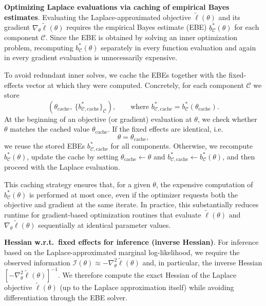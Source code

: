 \documentclass[12pt]{article}
\begin{document}
\textbf{Optimizing Laplace evaluations via caching of empirical Bayes estimates}. 
Evaluating the Laplace-approximated objective \(\tilde\ell(\theta)\) and its gradient \(\nabla_\theta \tilde\ell(\theta)\) requires the empirical Bayes estimate (EBE) \(b_{\mathcal{C}}^*(\theta)\) for each component \(\mathcal{C}\). Since the EBE is obtained by solving an inner optimization problem, recomputing \(b_{\mathcal{C}}^*(\theta)\) separately in every function evaluation and again in every gradient evaluation is unnecessarily expensive.

To avoid redundant inner solves, we cache the EBEs together with the fixed-effects vector at which they were computed. Concretely, for each component \(\mathcal{C}\) we store
\[
(\theta_{\mathrm{cache}},\ \{b_{\mathcal{C},\mathrm{cache}}^*\}_{\mathcal{C}}),
\qquad \text{where } b_{\mathcal{C},\mathrm{cache}}^* = b_{\mathcal{C}}^*(\theta_{\mathrm{cache}}).
\]
At the beginning of an objective (or gradient) evaluation at \(\theta\), we check whether \(\theta\) matches the cached value \(\theta_{\mathrm{cache}}\). If the fixed effects are identical, i.e.
\[
\theta = \theta_{\mathrm{cache}},
\]
we reuse the stored EBEs \(b_{\mathcal{C},\mathrm{cache}}^*\) for all components. Otherwise, we recompute \(b_{\mathcal{C}}^*(\theta)\), update the cache by setting \(\theta_{\mathrm{cache}}\leftarrow \theta\) and \(b_{\mathcal{C},\mathrm{cache}}^*\leftarrow b_{\mathcal{C}}^*(\theta)\), and then proceed with the Laplace evaluation.

This caching strategy ensures that, for a given \(\theta\), the expensive computation of \(b_{\mathcal{C}}^*(\theta)\) is performed at most once, even if the optimizer requests both the objective and gradient at the same iterate. In practice, this substantially reduces runtime for gradient-based optimization routines that evaluate \(\tilde\ell(\theta)\) and \(\nabla_\theta \tilde\ell(\theta)\) sequentially at identical parameter values.

\textbf{Hessian w.r.t.\ fixed effects for inference (inverse Hessian)}.
For inference based on the Laplace-approximated marginal log-likelihood, we require the observed information
\(
\mathcal{I}(\theta) \approx -\nabla_\theta^2 \tilde\ell(\theta)
\)
and, in particular, the inverse Hessian \(\left[-\nabla_\theta^2 \tilde\ell(\theta)\right]^{-1}\).
We therefore compute the exact Hessian of the Laplace objective \(\tilde\ell(\theta)\) (up to the Laplace approximation itself) while avoiding differentiation through the EBE solver.
\end{document}
